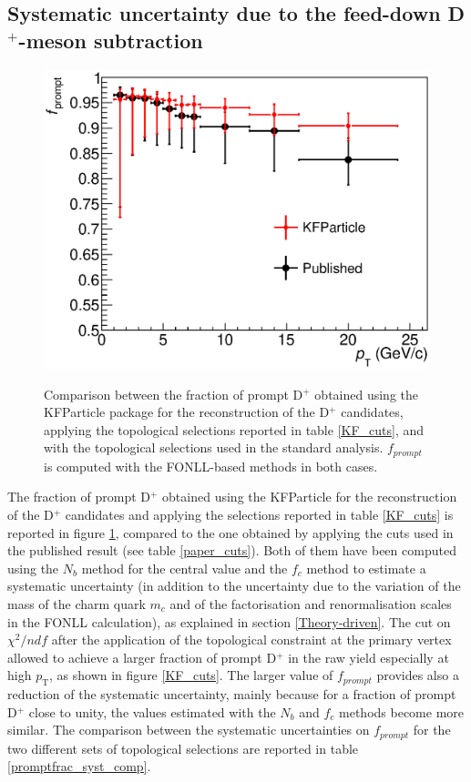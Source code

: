 \documentclass[b5paper,10pt,twoside,oldstyle,classica]{toptesi}
\newcommand{\pt}{p_\text{T}}
\begin{document}
\subsection{Systematic uncertainty due to the feed-down D$^+$-meson subtraction}
\begin{figure}[tb]
\begin{center}
{\includegraphics[scale = 0.5]{PromptFrac_KF.eps}}
\caption{Comparison between the fraction of prompt D$^+$ obtained using the KFParticle package for the reconstruction of the D$^+$ candidates, applying the topological selections reported in table \ref{KF_cuts}, and with the topological selections used in the standard analysis. $f_{prompt}$ is computed with the FONLL-based methods in both cases.}
\label{KF_promptfrac}
\end{center}
\end{figure} 
\label{KF_results}
The fraction of prompt D$^+$ obtained using the KFParticle for the reconstruction of the D$^+$ candidates and applying the selections reported in table \ref{KF_cuts} is reported in figure \ref{KF_promptfrac}, compared to the one obtained by applying the cuts used in the published result (see table \ref{paper_cuts}). Both of them have been computed using the $N_b$ method for the central value and the $f_c$ method to estimate a systematic uncertainty (in addition to the uncertainty due to the variation of the mass of the charm quark $m_c$ and of the factorisation and renormalisation scales in the FONLL calculation), as explained in section \ref{Theory-driven}. The cut on $\chi^2/ndf$ after the application of the topological constraint at the primary vertex allowed to achieve a larger fraction of prompt D$^+$ in the raw yield especially at high $\pt$, as shown in figure \ref{KF_cuts}. The larger value of $f_{prompt}$ provides also a reduction of the systematic uncertainty, mainly because for a fraction of prompt D$^+$ close to unity, the values estimated with the $N_b$ and $f_c$ methods become more similar. The comparison between the systematic uncertainties on $f_{prompt}$ for the two different sets of topological selections are reported in table \ref{promptfrac_syst_comp}.
\end{document}
